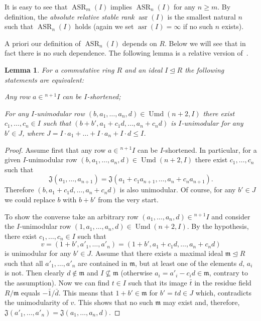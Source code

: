 \documentclass[oneside, 12pt]{amsart}
\theoremstyle{plain}
\numberwithin{equation}{section}
\newtheorem{lemma}{Lemma}
\numberwithin{lemma}{section}
\theoremstyle{definition}
\theoremstyle{remark}
\DeclareMathOperator{\asr}{asr}
\DeclareMathOperator{\ASR}{ASR}
\DeclareMathOperator{\Umd}{Umd}
\begin{document}
It is easy to see that $\ASR_m(I)$ implies $\ASR_n(I)$ for any $n\geqslant m$. 
By definition, the \emph{absolute relative stable rank} $\asr(I)$ is the smallest natural $n$ such that $\ASR_n(I)$ holds (again we set $\asr(I)=\infty$ if no such $n$ exists).

A priori our definition of $\ASR_n(I)$ depends on $R$.
Below we will see that in fact there is no such dependence.
The following lemma is a relative version of~\cite[Lemma~8.2]{MKV}. 
\begin{lemma}\label{lemma:relative-asr-unimod}
For a commutative ring $R$ and an ideal $I \trianglelefteq R$ the following statements are equivalent:
\begin{lemlist} 
\item\label{asr-j-stable} Any row $a\in{}^{n+1}\!I$ can be $I$-shortened;
\item\label{asr-bak-like} For any $I$-unimodular row $(b, a_1, \ldots, a_n, d)\in\Umd(n+2, I)$ there exist $c_1, \ldots, c_n\in I$ 
 such that $(b+b', a_1+c_1d, \ldots, a_n+c_nd)$ is $I$-unimodular for any $b'\in J$, where $J=I \cdot a_1 + \ldots + I \cdot a_n + I \cdot d\leqslant I$.
\end{lemlist} 
\end{lemma}
\begin{proof}
Assume first that any row $a\in{}^{n+1}\!I$ can be $I$-shortened. 
In particular, for a given $I$-unimodular row $(b, a_1, \ldots, a_n, d)\in\Umd(n+2, I)$ there exist $c_1, \ldots, c_n$ such that
\[\mathfrak{J}(a_1, \ldots, a_{n+1})=\mathfrak{J}(a_1+c_1a_{n+1}, \ldots, a_n+c_na_{n+1}).\]
Therefore $(b,a_1+c_1d,\ldots,a_n+c_nd)$ is also unimodular. Of course, for any $b'\in J$ we could replace $b$ with $b+b'$ from the very start.

To show the converse take an arbitrary row $(a_1, \ldots, a_n, d)\in{}^{n+1}\!I$ and consider the $I$-unimodular row $(1, a_1, \ldots, a_n, d)\in\Umd(n+2, I).$
By the hypothesis, there exist $c_1, \ldots, c_n\in I$ such that
\[ v=(1+b', a'_1, \ldots, a'_n)=(1+b', a_1+c_1d, \ldots, a_n+c_nd) \]
is unimodular for any $b'\in J$.
Assume that there exists a maximal ideal $\mathfrak{m}\trianglelefteq R$ such that all $a'_1, \ldots, a'_n$ are contained in $\mathfrak{m}$, but at least one of the elements $d$, $a_i$ is not.
Then clearly $d\notin\mathfrak{m}$ and $I\not\subseteq \mathfrak{m}$ (otherwise $a_i=a'_i-c_id\in\mathfrak{m}$, contrary to the assumption).
Now we can find $t\in I$ such that its image $\bar{t}$ in the residue field $R/\mathfrak{m}$ equals $-\bar{1}/\bar{d}$.
This means that $1 + b' \in \mathfrak{m}$ for $b'=td\in J$ which, contradicts the unimodularity of $v$.
This shows that no such $\mathfrak{m}$ may exist and, therefore, $\mathfrak{J}(a'_1, \ldots, a'_n)=\mathfrak{J}(a_1, \ldots, a_n, d)$.
\end{proof}
\end{document}
